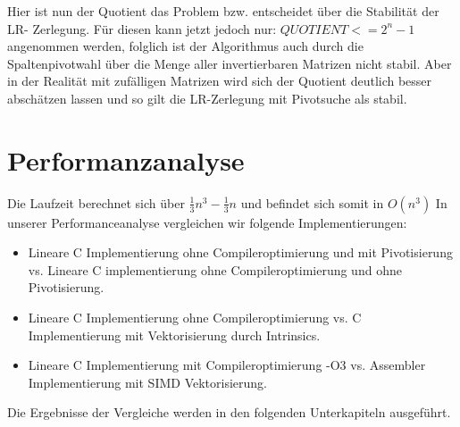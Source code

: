 \documentclass[course=erap]{aspdoc}
\begin{document}
Hier ist nun der Quotient das Problem bzw. entscheidet über die Stabilität der LR-
Zerlegung. Für diesen kann jetzt jedoch nur: $QUOTIENT <= 2^n-1$ angenommen 
werden, folglich ist der Algorithmus auch durch die Spaltenpivotwahl über die Menge 
aller invertierbaren Matrizen nicht stabil. Aber in der Realität mit zufälligen Matrizen wird 
sich der Quotient
 deutlich besser abschätzen lassen und so gilt die 
 LR-Zerlegung mit Pivotsuche als stabil.


\section{Performanzanalyse}
\label{Performanzanalyse}
Die Laufzeit berechnet sich über  $ \frac{1}{3}n^3 -\frac{1}{3} n $ und befindet sich somit in $O(n^3)$ \cite{LULaufzeit}
In unserer Performanceanalyse vergleichen wir folgende Implementierungen:\\
\begin{itemize}
\item Lineare C Implementierung ohne Compileroptimierung und mit Pivotisierung vs. Lineare C implementierung ohne Compileroptimierung und ohne Pivotisierung. 
\item Lineare C Implementierung ohne Compileroptimierung vs. C Implementierung mit Vektorisierung durch Intrinsics. 
\item Lineare C Implementierung mit Compileroptimierung -O3 vs. Assembler Implementierung mit SIMD Vektorisierung.
\end{itemize}
Die Ergebnisse der Vergleiche werden in den folgenden Unterkapiteln ausgeführt. \\
\end{document}
